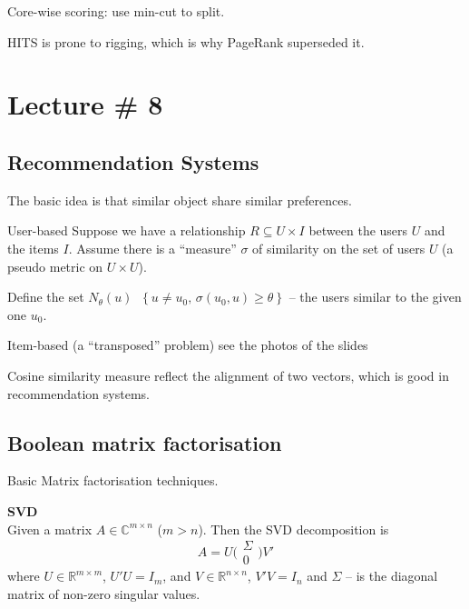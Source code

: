 \documentclass[a4paper]{article}
\newcommand{\obj}[1]{{\left\{ #1 \right \}}}
\newcommand{\Real}{\mathbb{R}}
\newcommand{\Cplx}{\mathbb{C}}
\newcommand{\defn}{\mathop{\overset{\Delta}{=}}\nolimits}
\begin{document}

Core-wise scoring: use min-cut to split.

HITS is prone to rigging, which is why PageRank superseded it.


\section{Lecture \# 8} %
\label{sec:lecture_8}

\subsection{Recommendation Systems} %
\label{sub:recommendation_systems}

The basic idea is that similar object share similar preferences.

User-based
Suppose we have a relationship $R\subseteq U\times I$ between the users $U$ and the items $I$.
Assume there is a ``measure'' $\sigma$ of similarity on the set of users $U$ (a pseudo metric on $U\times U$).

Define the set $N_\theta(u) \defn \obj{ u \neq u_0,\, \sigma(u_0, u) \geq \theta}$ -- the users 
similar to the given one $u_0$.

Item-based (a ``transposed'' problem)
 see the photos of the slides

Cosine similarity measure reflect the alignment of two vectors, which is good in recommendation systems.


\subsection{Boolean matrix factorisation} %
\label{sub:boolean_matrix_factorisation}

Basic Matrix factorisation techniques.

\noindent\textbf{SVD}\hfill \\
Given a matrix $A\in \Cplx^{m\times n}$ ($m>n$). Then the SVD decomposition is 
\[A = U \bigg(\begin{matrix}\Sigma \\ 0\end{matrix}\bigg) V'\]
where $U\in \Real^{m\times m}$, $U'U = I_m$, and $V\in \Real^{n\times n}$, $V'V = I_n$
and $\Sigma$ -- is the diagonal matrix of non-zero singular values.
\end{document}
